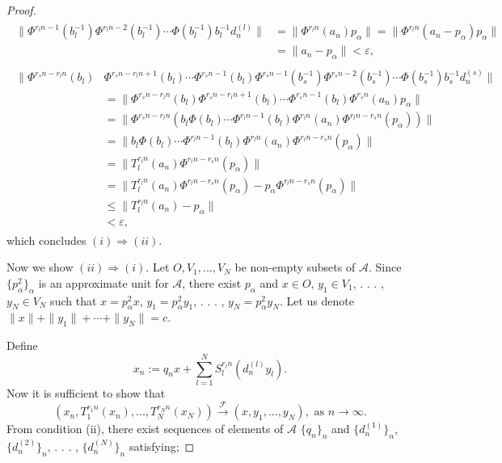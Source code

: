 \documentclass[10pt,a4paper]{amsart}
\begin{document}
\begin{proof}
\begin{eqnarray}\begin{split}\nonumber
\|\Phi^{r_{l}n-1}(b^{-1}_{l})\Phi^{r_{l}n-2}(b^{-1}_{l})\cdots\Phi(b^{-1}_{l})b^{-1}_{l}d^{(l)}_{n}\|&=\|\Phi^{r_{l}n}(a_{n})p_{\alpha}\|=\|\Phi^{r_{l}n}(a_{n}-p_{\alpha})p_{\alpha}\|
\\
&=\|a_{n}-p_{\alpha}\|<\varepsilon,
\end{split}
\end{eqnarray}
\begin{eqnarray}\begin{split}\nonumber
\|\Phi^{r_{s}n-r_{l}n}(b_{l})&\Phi^{r_{s}n-r_{l}n+1}(b_{l})\cdots\Phi^{r_{s}n-1}(b_{l})\Phi^{r_{s}n-1}(b^{-1}_{s})\Phi^{r_{s}n-2}(b^{-1}_{s})\cdots \Phi(b^{-1}_{s})b^{-1}_{s}d^{(s)}_{n}\|
\\
&=\|\Phi^{r_{s}n-r_{l}n}(b_{l})\Phi^{r_{s}n-r_{l}n+1}(b_{l})\cdots\Phi^{r_{s}n-1}(b_{l})\Phi^{r_{s}n}(a_{n})p_{\alpha}\|
\\
&=\|\Phi^{r_{s}n-r_{l}n}(b_{l}\Phi(b_{l})\cdots\Phi^{r_{l}n-1}(b_{l})\Phi^{r_{l}n}(a_{n})\Phi^{r_{l}n-r_{s}n}(p_{\alpha}))\|
\\
&=\|b_{l}\Phi(b_{l})\cdots \Phi^{r_{l}n-1}(b_{l}) \Phi^{r_{l}n}(a_{n})\Phi^{r_{l}n-r_{s}n}(p_{\alpha})\|
\\
&=\|T^{r_{l}n}_{l}(a_{n})\Phi^{r_{l}n-r_{s}n}(p_{\alpha})\|
\\
&=\|T^{r_{l}n}_{l}(a_{n})\Phi^{r_{l}n-r_{s}n}(p_{\alpha})-p_{\alpha}\Phi^{r_{l}n-r_{s}n}(p_{\alpha})\|
\\
&\leq\|T^{r_{l}n}_{l}(a_{n})-p_{\alpha}\|
\\
&<\varepsilon,
\end{split}
\end{eqnarray}
which concludes $(i)\Rightarrow(ii)$.

Now we show $(ii)\Rightarrow(i)$. Let $O, V_{1}, ..., V_{N}$ be non-empty subsets of $\mathcal{A}$. Since $\{p^{2}_{\alpha}\}_{\alpha}$ is an approximate unit for $\mathcal{A}$, there exist $p_{\alpha}$ and $x\in O$, $y_{1}\in V_{1}$, . . . , $y_{N}\in V_{N}$ such that $x=p^{2}_{\alpha}x$, $y_{1}=p^{2}_{\alpha}y_{1}$, . . . , $y_{N}=p^{2}_{\alpha}y_{N}$. 
Let us denote $\|x\|+\|y_{1}\|+\cdots+\|y_{N}\|=c$.

Define 
\[x_{n}:=q_{n}x+\sum^{N}_{l=1}S^{r_{l}n}_{l}(d^{(l)}_{n}y_{l}).\]
Now it is sufficient to show that 
\[(x_{n}, T^{r_{1}n}_{1}(x_{n}), ..., T^{r_{N}n}_{N}(x_{N}))\stackrel{\mathcal F}{\longrightarrow} (x, y_{1}, ..., y_{N}), \textrm{ as } n\rightarrow \infty.\] 
From condition (ii), there exist sequences of elements of $\mathcal{A}$ $\{q_{n}\}_{n}$ and $\{d^{(1)}_{n}\}_{n}$, $\{d^{(2)}_{n}\}_{n}$, . . . , $\{d^{(N)}_{n}\}_{n}$  satisfying;


\end{proof}
\end{document}
